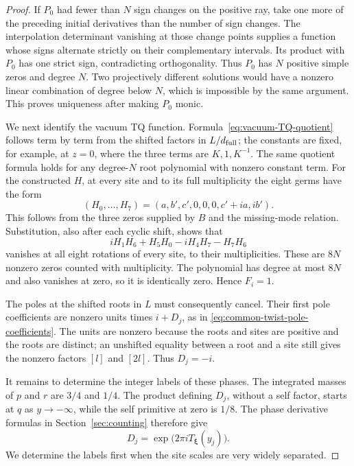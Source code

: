 \begin{proof}
If \(P_0\) had fewer than \(N\) sign changes on the positive ray, take one more of the preceding initial derivatives than the number of sign changes. The interpolation determinant vanishing at those change points supplies a function whose signs alternate strictly on their complementary intervals. Its product with \(P_0\) has one strict sign, contradicting orthogonality. Thus \(P_0\) has \(N\) positive simple zeros and degree \(N\). Two projectively different solutions would have a nonzero linear combination of degree below \(N\), which is impossible by the same argument. This proves uniqueness after making \(P_0\) monic.

We next identify the vacuum TQ function. Formula~\eqref{eq:vacuum-TQ-quotient} follows term by term from the shifted factors in \(L/d_{\rm full}\); the constants are fixed, for example, at \(z=0\), where the three terms are \(K,1,K^{-1}\). The same quotient formula holds for any degree-\(N\) root polynomial with nonzero constant term. For the constructed \(H\), at every site and to its full multiplicity the eight germs have the form
\[
 (H_0,\ldots,H_7)=(a,b',c',0,0,0,c'+ia,ib').
\]
This follows from the three zeros supplied by \(B\) and the missing-mode relation. Substitution, also after each cyclic shift, shows that
\[
 iH_1H_6+H_5H_0-iH_4H_7-H_7H_6
\]
vanishes at all eight rotations of every site, to their multiplicities. These are \(8N\) nonzero zeros counted with multiplicity. The polynomial has degree at most \(8N\) and also vanishes at zero, so it is identically zero. Hence \(F_i=1\).

The poles at the shifted roots in \(L\) must consequently cancel. Their first pole coefficients are nonzero units times \(i+D_j\), as in \eqref{eq:common-twist-pole-coefficients}. The units are nonzero because the roots and sites are positive and the roots are distinct; an unshifted equality between a root and a site still gives the nonzero factors \([l]\) and \([2l]\). Thus \(D_j=-i\).

It remains to determine the integer labels of these phases. The integrated masses of \(p\) and \(r\) are \(3/4\) and \(1/4\). The product defining \(D_j\), without a self factor, starts at \(q\) as \(y\to-\infty\), while the self primitive at zero is \(1/8\). The phase derivative formulas in Section~\ref{sec:counting} therefore give
\[
 D_j=\exp\bigl(2\pi iT_{\boldsymbol\xi}(y_j)\bigr).
\]
We determine the labels first when the site scales are very widely separated.


\end{proof}
